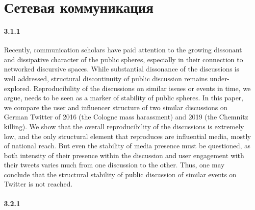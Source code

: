 \chapter{Сетевая коммуникация}\label{ch:ch3}

\subsubsection{3.1.1}

Recently, communication scholars have paid attention to the growing dissonant and dissipative character of the public spheres, especially in their connection to networked discursive spaces. While substantial dissonance of the discussions is well addressed, structural discontinuity of public discussion remains under-explored. Reproducibility of the discussions on similar issues or events in time, we argue, needs to be seen as a marker of stability of public spheres. In this paper, we compare the user and influencer structure of two similar discussions on German Twitter of 2016 (the Cologne mass harassment) and 2019 (the Chemnitz killing). We show that the overall reproducibility of the discussions is extremely low, and the only structural element that reproduces are influential media, mostly of national reach. But even the stability of media presence must be questioned, as both intensity of their presence within the discussion and user engagement with their tweets varies much from one discussion to the other. Thus, one may conclude that the structural stability of public discussion of similar events on Twitter is not reached.

\subsubsection{3.2.1}

